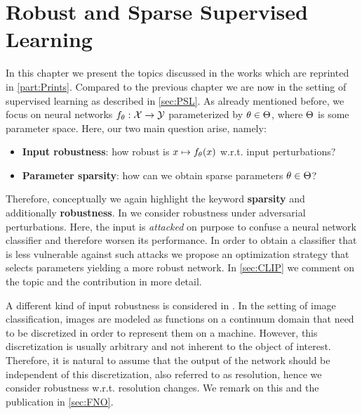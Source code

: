 \chapter{Robust and Sparse Supervised Learning}\label{ch:SL}
%
%
In this chapter we present the topics discussed in the works \cite{bungert2021clip, kabri2023resolution, bungert2022bregman} which are reprinted in \cref{part:Prints}. Compared to the previous chapter we are now in the setting of supervised learning as described in \cref{sec:PSL}. As already mentioned before, we focus on neural networks $f_\theta:\mathcal{X}\to\mathcal{\mathcal{Y}}$ parameterized by $\theta\in\Theta$, where $\Theta$ is some parameter space. Here, our two main question arise, namely:
\begin{itemize}
\item \textbf{Input robustness}: how robust is $x\mapsto f_\theta(x)$ w.r.t. input perturbations? 
\item \textbf{Parameter sparsity}: how can we obtain sparse parameters $\theta\in\Theta$?
\end{itemize}
%
%
\begin{center}%
\end{center}
%
%
Therefore, conceptually we again highlight the keyword \textbf{sparsity} and additionally \textbf{robustness}. In \cite{bungert2021clip} we consider robustness under adversarial perturbations. Here, the input is \emph{attacked} on purpose to confuse a neural network classifier and therefore worsen its performance. In order to obtain a classifier that is less vulnerable against such attacks we propose an optimization strategy that selects parameters yielding a more robust network. In \cref{sec:CLIP} we comment on the topic and the contribution in more detail. 

A different kind of input robustness is considered in \cite{kabri2023resolution}. In the setting of image classification, images are modeled as functions on a continuum domain that need to be discretized in order to represent them on a machine. However, this discretization is usually arbitrary and not inherent to the object of interest. Therefore, it is natural to assume that the output of the network should be independent of this discretization, also referred to as resolution, hence we consider robustness w.r.t. resolution changes. We remark on this and the publication in \cref{sec:FNO}.

